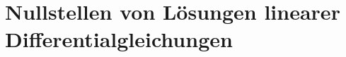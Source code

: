 %
%
%
\section{Nullstellen von Lösungen linearer Differentialgleichungen
\label{buch:variation2:section:diffgl}}

